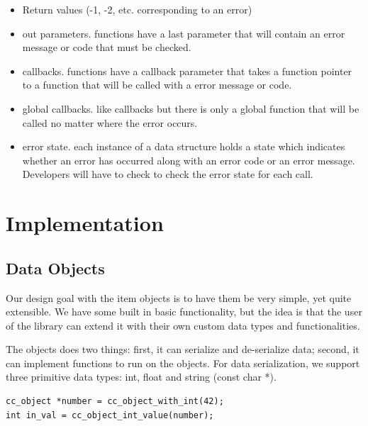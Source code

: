 \documentclass[table]{ituthesis}
\begin{document}
\begin{itemize}
	\item Return values (-1, -2, etc. corresponding to an error)
	\item out parameters. functions have a last parameter that will contain an error message or code that must be checked.
	\item callbacks. functions have a callback parameter that takes a function pointer to a function that will be called with a error message or code.
	\item global callbacks. like callbacks but there is only a global function that will be called no matter where the error occurs.
	\item error state. each instance of a data structure holds a state which indicates whether an error has occurred along with an error code or an error message. Developers will have to check to check the error state for each call.
\end{itemize}

\chapter{Implementation}

\section{Data Objects}\label{sec:impl_data_objects}

Our design goal with the item objects is to have them be very simple, yet quite extensible. We have some built in basic functionality, but the idea is that the user of the library can extend it with their own custom data types and functionalities.

The objects does two things: first, it can serialize and de-serialize data; second, it can implement functions to run on the objects. For data serialization, we support three primitive data types: int, float and string (const char *).

\begin{lstlisting}[label=cc_object-serialization,caption=Example of how to serialize an int to and from a cc\_object]
cc_object *number = cc_object_with_int(42);
int in_val = cc_object_int_value(number);
\end{lstlisting}
	
\end{document}

